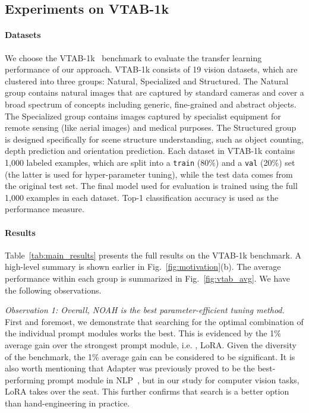 \subsection{Experiments on VTAB-1k}
\label{sec:exp;subsec:vtab}

\paragraph{Datasets}
We choose the VTAB-1k~\cite{zhai2019large} benchmark to evaluate the transfer learning performance of our approach. VTAB-1k consists of 19 vision datasets, which are clustered into three groups: Natural, Specialized and Structured. The Natural group contains natural images that are captured by standard cameras and cover a broad spectrum of concepts including generic, fine-grained and abstract objects. The Specialized group contains images captured by specialist equipment for remote sensing (like aerial images) and medical purposes. The Structured group is designed specifically for scene structure understanding, such as object counting, depth prediction and orientation prediction. Each dataset in VTAB-1k contains 1,000 labeled examples, which are split into a \texttt{train} (80\%) and a \texttt{val} (20\%) set (the latter is used for hyper-parameter tuning), while the test data comes from the original test set. The final model used for evaluation is trained using the full 1,000 examples in each dataset. Top-1 classification accuracy is used as the performance measure.

\paragraph{Results}
Table~\ref{tab:main_results} presents the full results on the VTAB-1k benchmark. A high-level summary is shown earlier in Fig.~\ref{fig:motivation}(b). The average performance within each group is summarized in Fig.~\ref{fig:vtab_avg}. We have the following observations.

\emph{Observation 1: Overall, NOAH is the best parameter-efficient tuning method.} First and foremost, we demonstrate that searching for the optimal combination of the individual prompt modules works the best. This is evidenced by the 1\% average gain over the strongest prompt module, i.e. , LoRA. Given the diversity of the benchmark, the 1\% average gain can be considered to be significant. It is also worth mentioning that Adapter was previously proved to be the best-performing prompt module in NLP~\cite{mao2021unipelt}, but in our study for computer vision tasks, LoRA takes over the seat. This further confirms that search is a better option than hand-engineering in practice.

